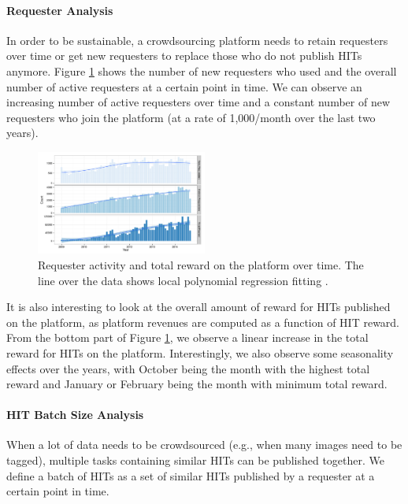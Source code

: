 \paragraph{Requester Analysis}
In order to be sustainable, a crowdsourcing platform needs to retain requesters over time or get new requesters to replace those who do not publish HITs anymore. Figure \ref{fig:requesters_reward} shows the number of new requesters who used \amt{} and the overall number of active requesters at a certain point in time. We can observe an increasing number of active requesters over time and a constant number of new requesters who join the platform (at a rate of 1,000/month over the last two years).

\begin{figure}[tb]
	\centering
		\includegraphics[width=0.5\textwidth]{figures/requesters_reward}
	\caption{Requester activity and total reward on the platform over time. The line over the data shows local polynomial regression fitting \cite{cleveland1992local}.}
	\label{fig:requesters_reward}
\end{figure}

It is also interesting to look at the overall amount of reward for HITs published on the platform, as platform revenues are computed as a function of HIT reward. From the bottom part of Figure \ref{fig:requesters_reward}, we observe a linear increase in the total reward for HITs on the platform. Interestingly, we also observe some seasonality effects over the years, with October being the month with the highest total reward and January or February being the month with minimum total reward.


\paragraph{HIT Batch Size Analysis}
When a lot of data needs to be crowdsourced (e.g., when many images need to be tagged), multiple  tasks containing similar HITs can be published together. We define a batch of HITs as a set of similar HITs published by a requester at a certain point in time. 

